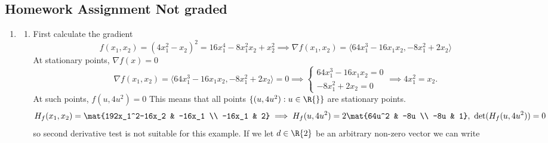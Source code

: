 \documentclass{article}
\begin{document}

    \begin{tasks}
        \section*{Homework Assignment {\color{faded}Not graded}}
        \begin{enumerate}[label={\color{tcum}P \arabic{week}.\arabic*}]
            \item {\begin{enumerate}
                    \item First calculate the gradient
                        \begin{displaymath}
                            f(x_1, x_2) = (4x_1^2-x_2)^2 = 16x_1^4 - 8x_1^2x_2 + x_2^2 \implies \nabla f(x_1, x_2) = \langle 64x_1^3-16x_1x_2, -8x_1^2+2x_2\rangle
                        \end{displaymath}
                        At stationary points, \(\nabla f(x) = 0\)
                        \begin{displaymath}
                            \nabla f(x_1, x_2) = \langle64x_1^3-16x_1x_2, -8x_1^2+2x_2\rangle = 0 \implies
                            \begin{cases}
                                64x_1^3-16x_1x_2 = 0\\
                                -8x_1^2+2x_2 = 0
                            \end{cases}
                            \implies
                            4x_1^2=x_2.
                        \end{displaymath}
                        At such points, \(f(u, 4u^2) = 0\)
                        This means that all points \(\{(u, 4u^2) : u\in\R{}\}\) are stationary points.
                        \begin{displaymath}
                            H_f(x_1, x_2) = \mat{192x_1^2-16x_2 & -16x_1 \\ -16x_1 & 2}
                            \implies
                            H_f(u, 4u^2) = 2\mat{64u^2 & -8u \\ -8u & 1},\ \det(H_f(u, 4u^2)) = 0
                        \end{displaymath}
                        so second derivative test is not suitable for this example. If we let \(d\in\R{2}\) be an arbitrary non-zero vector we can write
                        \begin{displaymath}

\end{displaymath}
\end{enumerate}}
\end{enumerate}
\end{tasks}
\end{document}
